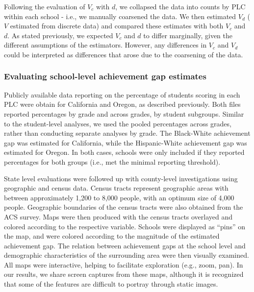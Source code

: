 \documentclass[man, fleqn, noextraspace]{apa6}
\theoremstyle{definition}
\theoremstyle{definition}
\theoremstyle{definition}
\theoremstyle{remark}
\begin{document}
Following the evaluation of \(V_c\) with \(d\), we collapsed the data
into counts by PLC within each school - i.e., we manually coarsened the
data. We then estimated \(V_d\) (\(V\) estimated from discrete data) and
compared these estimates with both \(V_c\) and \(d\). As stated
previously, we expected \(V_c\) and \(d\) to differ marginally, given
the different assumptions of the estimators. However, any differences in
\(V_c\) and \(V_d\) could be interpreted as differences that arose due
to the coarsening of the data.

\hypertarget{evaluating-school-level-achievement-gap-estimates}{%
\subsubsection{Evaluating school-level achievement gap
estimates}\label{evaluating-school-level-achievement-gap-estimates}}

Publicly available data reporting on the percentage of students scoring
in each PLC were obtain for California and Oregon, as described
previously. Both files reported percentages by grade and across grades,
by student subgroups. Similar to the student-level analyses, we used the
pooled percentages across grades, rather than conducting separate
analyses by grade. The Black-White achievement gap was estimated for
California, while the Hispanic-White achievement gap was estimated for
Oregon. In both cases, schools were only included if they reported
percentages for both groups (i.e., met the minimal reporting threshold).

State level evaluations were followed up with county-level
investigations using geographic and census data. Census tracts represent
geographic areas with between approximately 1,200 to 8,000 people, with
an optimum size of 4,000 people. Geographic boundaries of the census
tracts were also obtained from the ACS survey. Maps were then produced
with the census tracts overlayed and colored according to the respective
variable. Schools were displayed as \enquote{pins} on the map, and were
colored according to the magnitude of the estimated achievement gap. The
relation between achievement gaps at the school level and demographic
characteristics of the surrounding area were then visually examined. All
maps were interactive, helping to facilitate exploration (e.g., zoom,
pan). In our results, we share screen captures from these maps, although
it is recognized that some of the features are difficult to portray
through static images.
\end{document}
